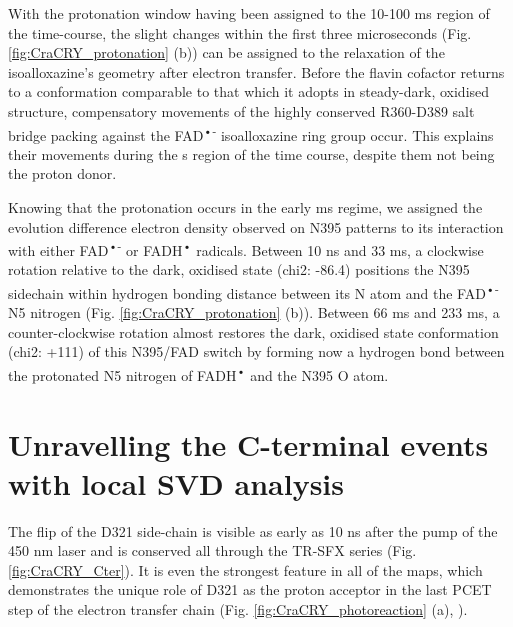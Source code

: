 With the protonation window having been assigned to the 10-100 ms region of the time-course, the slight changes within the first three microseconds (Fig. \ref{fig:CraCRY_protonation} (b)) can be assigned to the relaxation of the isoalloxazine’s geometry after electron transfer. Before the flavin cofactor returns to a conformation comparable to that which it adopts in steady-dark, oxidised structure, compensatory movements of the highly conserved R360-D389 salt bridge packing against the FAD\textsuperscript{•-} isoalloxazine ring group occur. This explains their movements during the \textmu s region of the time course, despite them not being the proton donor. 

Knowing that the protonation occurs in the early ms regime, we assigned the evolution difference electron density observed on N395 patterns to its interaction with either FAD\textsuperscript{•-} or FADH\textsuperscript{•} radicals. Between 10 ns and 33 ms, a clockwise rotation relative to the dark, oxidised state (\textDelta chi2: -86.4\degree) positions the N395 sidechain within hydrogen bonding distance between its N atom and the FAD\textsuperscript{•-} N5 nitrogen (Fig. \ref{fig:CraCRY_protonation} (b)). Between 66 ms and 233 ms, a counter-clockwise rotation almost restores the dark, oxidised state conformation (\textDelta chi2: +111\degree) of this N395/FAD switch by forming now a hydrogen bond between the protonated N5 nitrogen of FADH\textsuperscript{•} and the N395 O atom. 

\section{Unravelling the C-terminal events with local SVD analysis}\label{sec:SVD_CraCRY}

The flip of the D321 side-chain is visible as early as 10 ns after the pump of the 450 nm laser and is conserved all through the TR-SFX series (Fig. \ref{fig:CraCRY_Cter}). It is even the strongest feature in all of the maps, which demonstrates the unique role of D321 as the proton acceptor in the last PCET step of the electron transfer chain (Fig. \ref{fig:CraCRY_photoreaction} (a), \cite{lacombatUltrafastOxidationTyrosine2019}).

